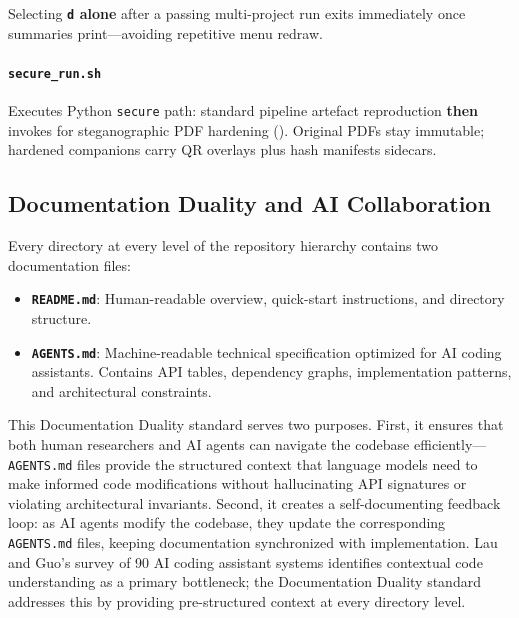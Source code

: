 \documentclass[
]{article}
\providecommand{\tightlist}{%
  \setlength{\itemsep}{0pt}\setlength{\parskip}{0pt}}
\begin{document}
Selecting \textbf{\texttt{d} alone} after a passing multi-project run
exits immediately once summaries print---avoiding repetitive menu
redraw.

\paragraph{\texorpdfstring{\texttt{secure\_run.sh}}{secure_run.sh}}\label{secure_run.sh}

Executes Python \texttt{secure} path: standard pipeline artefact
reproduction \textbf{then} invokes  for
steganographic PDF hardening ().
Original PDFs stay immutable; hardened companions carry QR overlays plus
hash manifests sidecars.

\newpage

\subsection{Documentation Duality and AI
Collaboration}\label{documentation-duality-and-ai-collaboration}

Every directory at every level of the repository hierarchy contains two
documentation files:

\begin{itemize}
\tightlist
\item
  \textbf{\texttt{README.md}}: Human-readable overview, quick-start
  instructions, and directory structure.
\item
  \textbf{\texttt{AGENTS.md}}: Machine-readable technical specification
  optimized for AI coding assistants. Contains API tables, dependency
  graphs, implementation patterns, and architectural constraints.
\end{itemize}

This Documentation Duality standard serves two purposes. First, it
ensures that both human researchers and AI agents can navigate the
codebase efficiently---\texttt{AGENTS.md} files provide the structured
context that language models need to make informed code modifications
without hallucinating API signatures or violating architectural
invariants. Second, it creates a self-documenting feedback loop: as AI
agents modify the codebase, they update the corresponding
\texttt{AGENTS.md} files, keeping documentation synchronized with
implementation. Lau and Guo's survey of 90 AI coding assistant systems
\citep{lau2025aicoding} identifies contextual code understanding as a
primary bottleneck; the Documentation Duality standard addresses this by
providing pre-structured context at every directory level.
\end{document}
